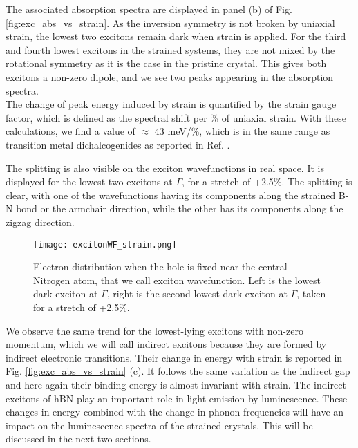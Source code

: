 The associated absorption spectra are displayed in panel (b) of Fig. \ref{fig:exc_abs_vs_strain}. As the inversion symmetry is not broken by uniaxial strain, the lowest two excitons remain dark when strain is applied. For the third and fourth lowest excitons in the strained systems, they are not mixed by the rotational symmetry as it is the case in the pristine crystal. This gives both excitons a non-zero dipole, and we see two peaks appearing in the absorption spectra. \\
The change of peak energy induced by strain is quantified by the strain gauge factor, which is defined as the spectral shift per \% of uniaxial strain. With these calculations, we find a value of $\approx$ 43 meV/\%, which is in the same range as transition metal dichalcogenides as reported in Ref. \cite{carrascoso2021strain}.

The splitting is also visible on the exciton wavefunctions in real space. It is displayed for the lowest two excitons at $\Gamma$, for a stretch of +2.5\%. The splitting is clear, with one of the wavefunctions having its components along the strained B-N bond or the armchair direction, while the other has its components along the zigzag direction.
\begin{figure}[tbp]
	\vspace{0.2cm}
	\setcapindent{2em}
	\centering
	\texttt{[image: excitonWF\_strain.png]}
	\caption{Electron distribution when the hole is fixed near the central Nitrogen atom, that we call exciton wavefunction. Left is the lowest dark exciton at $\Gamma$, right is the second lowest dark exciton at $\Gamma$, taken for a stretch of +2.5\%.}
	\label{fig:excWF_strain}
\end{figure}

We observe the same trend for the lowest-lying excitons with non-zero momentum, which we will call indirect excitons because they are formed by indirect electronic transitions. Their change in energy with strain is reported in Fig. \ref{fig:exc_abs_vs_strain} (c). It follows the same variation as the indirect gap and here again their binding energy is almost invariant with strain. The indirect excitons of hBN play an important role in light emission by luminescence. These changes in energy combined with the change in phonon frequencies will have an impact on the luminescence spectra of the strained crystals. This will be discussed in the next two sections.

%
